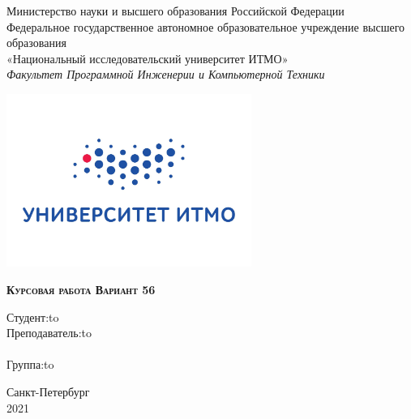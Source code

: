 \Large
\thispagestyle{empty}
\begin{center}
Министерство науки и высшего образования Российской Федерации \\
Федеральное государственное автономное образовательное учреждение высшего образования \\
«Национальный исследовательский университет ИТМО» \\
\vspace{1em}
\textsl{Факультет Программной Инженерии и Компьютерной Техники}\\
\end{center}

\vspace{1em}

\thispagestyle{empty}
\begin{center}
\includegraphics[width=8cm]{imgs/itmo.jpg}
\end{center}

\vspace{3em}

\begin{center}
\large{
\textsc{\textbf{
Курсовая работа \linebreak 
Вариант 56}}
}
\end{center}

\vspace{12em}



\newbox{\lbox}
\savebox{\lbox}{\hbox{\studName}}
\newlength{\maxl}
\setlength{\maxl}{\wd\lbox}
\hfill\parbox{11cm}{
\hspace*{5cm}\hspace*{-5cm}Студент:\hfill\hbox to\maxl{\studName\hfill}\\
\hspace*{5cm}\hspace*{-5cm}Преподаватель:\hfill\hbox to\maxl{\teacherName}\\
\\
\hspace*{5cm}\hspace*{-5cm}Группа:\hfill\hbox to\maxl{\groupNumber}\\
}

\vspace{\fill}

\begin{center}
Санкт-Петербург \\2021
\end{center}
\newpage